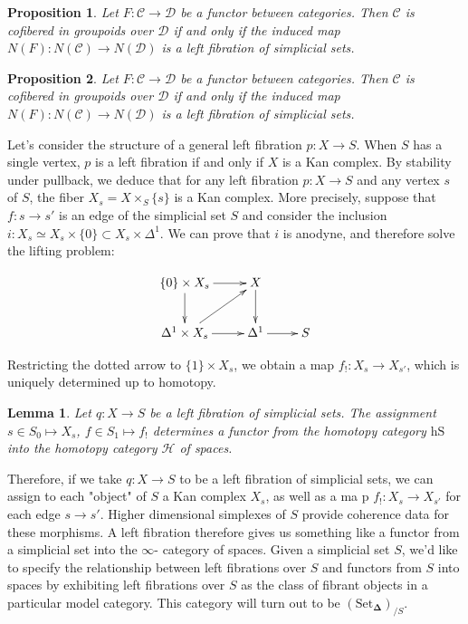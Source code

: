 \documentclass[a4paper, 12pt]{amsart}
\newcommand{\8}{\infty}
\newcommand{\SSet}{\text{Set}_\boldsymbol{\Delta}}
\newcommand{\HCal}{\mathcal{H}}
\newtheorem{lemma}{Lemma}
\newtheorem{proposition}{Proposition}
\begin{document}
\begin{proposition}
  Let $F:\mathcal{C}\rightarrow\mathcal{D}$ be a functor between categories. Then $\mathcal{C}$ is cofibered in groupoids over $\mathcal{D}$  if and only if the induced map $N(F):N(\mathcal{C})\rightarrow N(\mathcal{D})$ is a left fibration of simplicial sets.
\end{proposition}


\begin{proposition}
  Let $F:\mathcal{C}\rightarrow\mathcal{D}$ be a functor between categories. Then $\mathcal{C}$ is cofibered in groupoids over $\mathcal{D}$  if and only if the induced map $N(F):N(\mathcal{C})\rightarrow N(\mathcal{D})$ is a left fibration of simplicial sets.
\end{proposition}

Let's consider the structure of a general left fibration $p:X\rightarrow S$. When $S$ has a single vertex, $p$ is a left fibration if and only if $X$ is a Kan complex. By stability under pullback, we deduce that for any left fibration $p:X\rightarrow S$ and any vertex $s$ of $S$, the fiber $X_s = X\times_S\{s\}$ is a Kan complex. More precisely, suppose that $f:s\rightarrow s'$ is an edge of the simplicial set $S$
and consider the inclusion $i:X_s\simeq X_s\times\{0\} \subset X_s\times \Delta^1$. We can prove that $i$ is anodyne, and therefore solve the lifting problem:

$$
  \begin{xy}
    \xymatrix{
      \{0\}\times X_s\ar[r]\ar[d] & X \ar[d] &\\
      \Delta^1\times X_s\ar[r]\ar[ur] & \Delta^1\ar[r] & S
    }
  \end{xy}
$$

Restricting the dotted arrow to $\{1\}\times X_s$, we obtain a map $f_!:X_s\rightarrow X_{s'}$, which is uniquely determined up to homotopy.


\begin{lemma}
  Let $q : X \rightarrow S$ be a left fibration of simplicial sets. The assignment $s \in S_0 \mapsto X_s$, $f \in S_1 \mapsto f_!$ determines a functor from the homotopy category $\text{hS}$ into the homotopy category $\HCal$ of spaces.
\end{lemma}

 Therefore, if we take $q: X\rightarrow S$ to be a left fibration of simplicial sets, we can assign to each "object" of $S$ a Kan complex $X_s$, as well as a ma p $f_{!}: X_s \rightarrow X_{s'}$ for each edge $s\rightarrow s'$. Higher dimensional simplexes of $S$ provide coherence data for these morphisms. A left fibration therefore gives us something like a functor from a simplicial set into the $\8$- category of spaces. Given a simplicial set $S$, we'd like to specify the relationship between left fibrations over $S$ and functors from $S$ into spaces by exhibiting left fibrations over $S$ as the class of fibrant objects in a particular model category. This category will turn out to be $(\SSet)_{/S}$.
\end{document}
